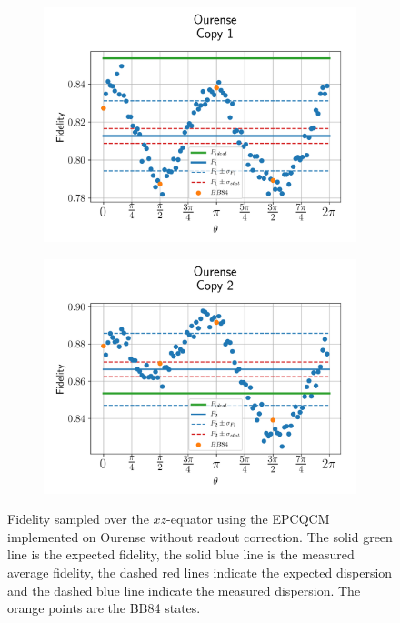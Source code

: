 \begin{figure}[H]
  \centering
  \begin{subfigure}{.5\textwidth}
    \centering
    \includegraphics[width=\textwidth]{Figures/Economical/IBM/OnlyEquator/results_ourense_copy1.png}
    \label{fig:epc_uncorrected_ourense_equator_1}
  \end{subfigure}%
  \begin{subfigure}{.5\textwidth}
    \centering
    \includegraphics[width=\textwidth]{Figures/Economical/IBM/OnlyEquator/results_ourense_copy2.png}
    \label{fig:epc_uncorrected_ourense_equator_2}
  \end{subfigure}
  \vspace{-0.5cm}
  \caption{Fidelity sampled over the $xz$-equator using the EPCQCM implemented on Ourense without readout correction. The solid green line is the expected fidelity, the solid blue line is the measured average fidelity, the dashed red lines indicate the expected dispersion and the dashed blue line indicate the measured dispersion. The orange points are the BB84 states.}
  \label{fig:epc_uncorrected_ourense_equator}
\end{figure}

